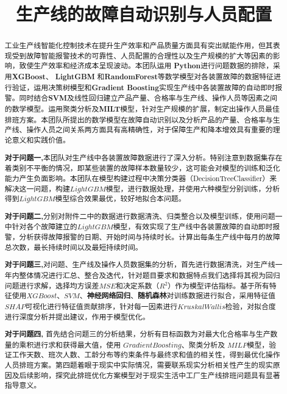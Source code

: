 \documentclass[withoutpreface,bwprint]{cumcmthesis}
\title{生产线的故障自动识别与人员配置}  %
\begin{document}
\maketitle

\begin{abstract}
工业生产线智能化控制技术在提升生产效率和产品质量方面具有突出赋能作用，但其表现受到故障智能报警技术的可靠性、人员配置的合理性以及生产规模的扩大等因素的影响，致使生产效率和经济成本呈现波动。本团队运用 \textbf{Python}进行问题数据的排除，采用\textbf{XGBoost}、 \textbf{LightGBM} 和\textbf{RandomForest}等数学模型对各装置故障的数据特征进行验证，运用决策树模型和\textbf{Gradient Boosting}实现生产线中各装置故障的自动即时报警。同时结合\textbf{SVM}及线性回归建立产品产量、合格率与生产线、操作人员等因素之间的数学模型。运用聚类分析及\textbf{MILT}模型，针对生产规模的扩展，制定出操作人员最佳排班方案。本团队所提出的数学模型在故障自动识别以及分析产品的产量、合格率与生产线、操作人员之间关系两方面具有高精确性，对于保障生产和降本增效具有重要的理论意义和实践价值。

\textbf{对于问题一,}本团队对生产线中各装置故障数据进行了深入分析。特别注意到数据集存在着类别不平衡的情况，即某些装置的故障样本数量较少，这可能会对模型的训练和泛化能力产生负面影响。本团队在模型构建过程中决策分类器（DecisionTreeClassifier）来解决这一问题，构建\(LightGBM\)模型，进行数据处理，并使用六种模型分别训练，分析得到\(LightGBM\)模型综合效果最优，较好地拟合本问题。

\textbf{对于问题二,}分别对附件二中的数据进行数据清洗、归类整合以及模型训练，使用问题一中针对各个故障建立的\(LightGBM\)模型，有效实现了生产线中各装置故障的自动即时报警，分析获得故障报警的日期、开始时间与持续时长。计算出每条生产线中每月的故障总次数，最长持续时间以及最短持续时间。

\textbf{对于问题三,}对问题、生产线及操作人员数据集的分析，首先进行数据清洗，对生产线一年内整体情况进行汇总、整合及迭代，针对题目要求和数据特点我们选择将其视为回归问题进行求解，选择均方误差\(MSE\)和决定系数（$R^2$）作为模型评估指标。基于所有特征使用\(XGBoost\)、\(SVM\)、\textbf{神经网络回归}、\textbf{随机森林}对训练数据进行拟合，采用特征值\(SHAP\)可视化进行特征值贡献排序，针对每一因素进行\(Kruskal Wallis\)检验，对拟合度进行深度分析并提出建议，作用于模型优化。

\textbf{对于问题四,} 首先结合问题三的分析结果，分析有目标函数为对最大化合格率与生产数量的乘积进行求和获得最大值，使用 \(Gradient Boosting\)、聚类分析及 \(MILP\)模型，验证工作天数、班次人数、工龄分布等约束条件与最终求和值的相关性，得到最优化操作人员排班方案。第四题着眼于现实中实际情况，需要联系现实分析相关性产生的现实原因及后续影响，探究此排班优化方案模型对于现实生活中工厂生产线排班问题具有显著指导意义。

\end{abstract}
\end{document}
